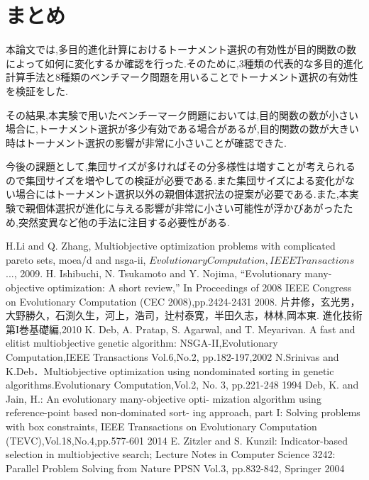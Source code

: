 \documentclass[a4paper,10pt]{jarticle}
\begin{document}
\vspace{+20mm}
\section{まとめ}
\vspace{-2mm}
本論文では,多目的進化計算におけるトーナメント選択の有効性が目的関数の数によって如何に変化するか確認を行った.そのために,3種類の代表的な多目的進化計算手法と8種類のベンチマーク問題を用いることでトーナメント選択の有効性を検証をした.

その結果,本実験で用いたベンチーマーク問題においては,目的関数の数が小さい場合に,トーナメント選択が多少有効である場合があるが,目的関数の数が大きい時はトーナメント選択の影響が非常に小さいことが確認できた.

今後の課題として,集団サイズが多ければその分多様性は増すことが考えられるので集団サイズを増やしての検証が必要である.また集団サイズによる変化がない場合にはトーナメント選択以外の親個体選択法の提案が必要である.また,本実験で親個体選択が進化に与える影響が非常に小さい可能性が浮かびあがったため,突然変異など他の手法に注目する必要性がある.

\begin{thebibliography}{9}
   H.Li and Q. Zhang,
    Multiobjective optimization problems with complicated pareto sets, moea/d and nsga-ii,
    $Evolutionary Computation, IEEE Transactions$..., 2009.
     H. Ishibuchi, N. Tsukamoto and Y. Nojima, “Evolutionary many-objective optimization: A short review,” In Proceedings of 2008 IEEE Congress on Evolutionary Computation (CEC 2008),pp.2424-2431 2008. 
    片井修，玄光男，大野勝久，石渕久生，河上，浩司，辻村泰寛，半田久志，林林,岡本東. 進化技術 第I巻基礎編,2010
   K. Deb, A. Pratap, S. Agarwal, and T. Meyarivan. A fast and elitist multiobjective genetic algorithm: NSGA-II,Evolutionary Computation,IEEE Transactions Vol.6,No.2, pp.182-197,2002  
  N.Srinivas and K.Deb．Multiobjective optimization using nondominated sorting in genetic algorithms.Evolutionary Computation,Vol.2, No. 3, pp.221-248 1994
   Deb, K. and Jain, H.: An evolutionary many-objective opti- mization algorithm using reference-point based non-dominated sort- ing approach, part I: Solving problems with box constraints, IEEE Transactions on Evolutionary Computation (TEVC),Vol.18,No.4,pp.577-601 2014
  E. Zitzler and S. Kunzil: Indicator-based selection in multiobjective search; Lecture Notes in Computer Science 3242: Parallel Problem Solving from Nature PPSN Vol.3, pp.832-842, Springer 2004 
 
   \end{thebibliography}
\end{document}
